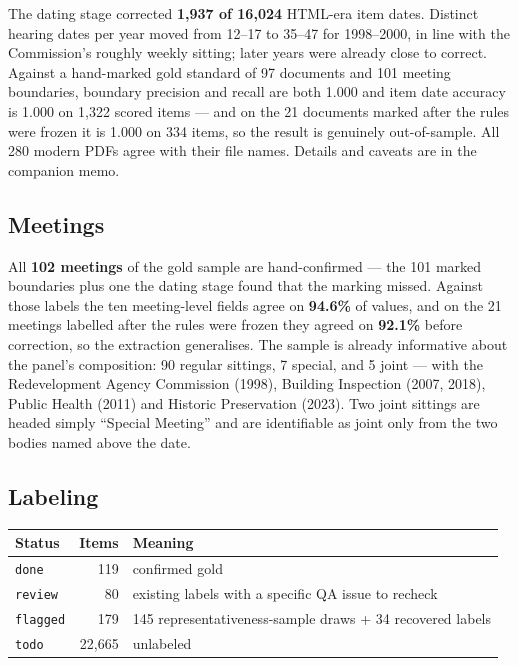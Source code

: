 \documentclass[11pt]{article}
\begin{document}
The dating stage corrected \textbf{1{,}937 of 16{,}024} HTML-era item dates. Distinct
hearing dates per year moved from 12--17 to 35--47 for 1998--2000, in line with the
Commission's roughly weekly sitting; later years were already close to correct. Against a
hand-marked gold standard of 97 documents and 101 meeting boundaries, boundary precision
and recall are both 1.000 and item date accuracy is 1.000 on 1{,}322 scored items --- and
on the 21 documents marked after the rules were frozen it is 1.000 on 334 items, so the
result is genuinely out-of-sample. All 280 modern PDFs agree with their file names. Details
and caveats are in the companion memo.

\subsection{Meetings}

All \textbf{102 meetings} of the gold sample are hand-confirmed --- the 101 marked
boundaries plus one the dating stage found that the marking missed. Against those labels
the ten meeting-level fields agree on \textbf{94.6\%} of values, and on the 21 meetings
labelled after the rules were frozen they agreed on \textbf{92.1\%} before correction, so
the extraction generalises. The sample is already informative about the panel's
composition: 90 regular sittings, 7 special, and 5 joint --- with the Redevelopment Agency
Commission (1998), Building Inspection (2007, 2018), Public Health (2011) and Historic
Preservation (2023). Two joint sittings are headed simply ``Special Meeting'' and are
identifiable as joint only from the two bodies named above the date.

\subsection{Labeling}

\begin{table}[h]
\centering
\begin{tabular}{lrl}
\toprule
Status & Items & Meaning \\
\midrule
\texttt{done} & 119 & confirmed gold \\
\texttt{review} & 80 & existing labels with a specific QA issue to recheck \\
\texttt{flagged} & 179 & 145 representativeness-sample draws + 34 recovered labels \\
\texttt{todo} & 22{,}665 & unlabeled \\
\bottomrule
\end{tabular}
\end{table}
\end{document}
